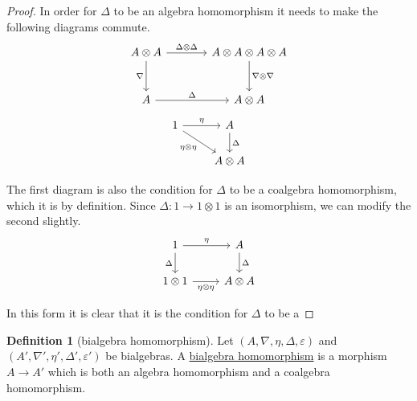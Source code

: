 \documentclass[a4paper,10pt]{scrreprt}
\newcommand{\defn}[1]{\ul{#1}}
\theoremstyle{definition}
\newtheorem{definition}{Definition}[section]
\theoremstyle{plain}
\theoremstyle{remark}
\begin{document}
\begin{proof}
  In order for $\Delta$ to be an algebra homomorphism it needs to make the following diagrams commute.
  \begin{equation*}
    \begin{tikzcd}[row sep=large, column sep=large]
      A \otimes A
      \arrow[r, "\Delta \otimes \Delta"]
      \arrow[d, swap, "\nabla"]
      & A \otimes A \otimes A \otimes A
      \arrow[d, "\nabla \otimes \nabla"]
      \\
      A
      \arrow[r, "\Delta"]
      & A \otimes A
    \end{tikzcd}
  \end{equation*}
  \begin{equation*}
    \begin{tikzcd}
      1
      \arrow[r, "\eta"]
      \arrow[rd, swap, "\eta \otimes \eta"]
      & A
      \arrow[d, "\Delta"]
      \\
      & A \otimes A
    \end{tikzcd}
  \end{equation*}

  The first diagram is also the condition for $\Delta$ to be a coalgebra homomorphism, which it is by definition. Since $\Delta\colon 1 \to 1 \otimes 1$ is an isomorphism, we can modify the second slightly.
  \begin{equation*}
    \begin{tikzcd}
      1
      \arrow[r, "\eta"]
      \arrow[d, swap, "\Delta"]
      & A
      \arrow[d, "\Delta"]
      \\
      1 \otimes 1
      \arrow[r, swap, "\eta \otimes \eta"]
      & A \otimes A
    \end{tikzcd}
  \end{equation*}

  In this form it is clear that it is the condition for $\Delta$ to be a 
\end{proof}

\begin{definition}[bialgebra homomorphism]
  \label{def:bialgebrahomomorphism}
  Let $(A, \nabla, \eta, \Delta, \varepsilon)$ and $(A', \nabla', \eta', \Delta', \varepsilon')$ be bialgebras. A \defn{bialgebra homomorphism} is a morphism $A \to A'$ which is both an algebra homomorphism and a coalgebra homomorphism.
\end{definition}
\end{document}
